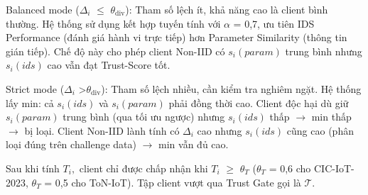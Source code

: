 Balanced mode ($\Delta_{i}$ $\leq$ $\theta_{\text{div}}$): Tham số lệch ít, khả năng cao là client bình thường. Hệ thống sử dụng kết hợp tuyến tính với $\alpha$ = 0,7, ưu tiên IDS Performance (đánh giá hành vi trực tiếp) hơn Parameter Similarity (thông tin gián tiếp). Chế độ này cho phép client Non-IID có $s_{i}(param)$ trung bình nhưng $s_{i}(ids)$ cao vẫn đạt Trust-Score tốt.

Strict mode ($\Delta_{i}$ \textgreater $\theta_{\text{div}}$): Tham số lệch nhiều, cần kiểm tra nghiêm ngặt. Hệ thống lấy min: cả $s_{i}(ids)$ và $s_{i}(param)$ phải đồng thời cao. Client độc hại dù giữ $s_{i}(param)$ trung bình (qua tối ưu ngược) nhưng $s_{i}(ids)$ thấp $\rightarrow$ min thấp $\rightarrow$ bị loại. Client Non-IID lành tính có $\Delta_{i}$ cao nhưng $s_{i}(ids)$ cũng cao (phân loại đúng trên challenge data) $\rightarrow$ min vẫn đủ cao.

Sau khi tính $T_{i},$ client chỉ được chấp nhận khi $T_{i}$ $\geq$ $\theta_{T}$ ($\theta_{T}$ = 0,6 cho CIC-IoT-2023, $\theta_{T}$ = 0,5 cho ToN-IoT). Tập client vượt qua Trust Gate gọi là $\mathcal{T}$.

